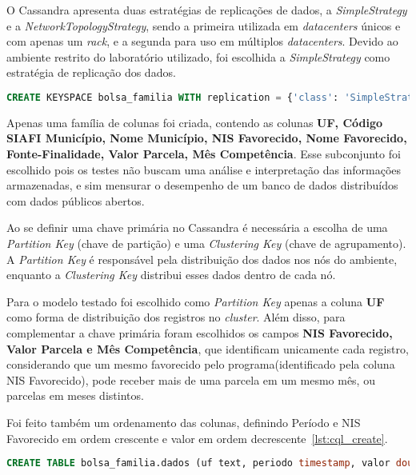 O Cassandra apresenta duas estratégias de replicações de dados, a \emph{SimpleStrategy} e a \emph{NetworkTopologyStrategy}, sendo a primeira utilizada em \emph{datacenters} únicos e com apenas um \emph{rack}, e a segunda para uso em múltiplos \emph{datacenters}. Devido ao ambiente restrito do laboratório utilizado, foi escolhida a \emph{SimpleStrategy} como estratégia de replicação dos dados.

\noindent
\begin{minipage}[c]{1\textwidth}
\begin{lstlisting}[caption={Código CQL criação do keyspace},label={lst:cql_create_keyspace},language=SQL]
CREATE KEYSPACE bolsa_familia WITH replication = {'class': 'SimpleStrategy', 'replication_factor': 1};
\end{lstlisting}
\end{minipage}

Apenas uma família de colunas foi criada, contendo as colunas \textbf{UF, Código SIAFI Município, Nome Município, NIS Favorecido, Nome Favorecido, Fonte-Finalidade, Valor Parcela, Mês Competência}. Esse subconjunto foi escolhido pois os testes não buscam uma análise e interpretação das informações armazenadas, e sim mensurar o desempenho de um banco de dados distribuídos com dados públicos abertos.

Ao se definir uma chave primária no Cassandra é necessária a escolha de uma \emph{Partition Key} (chave de partição) e uma \emph{Clustering Key} (chave de agrupamento). A \emph{Partition Key} é responsável pela distribuição dos dados nos nós do ambiente, enquanto a \emph{Clustering Key} distribui esses dados dentro de cada nó.

Para o modelo testado foi escolhido como \emph{Partition Key} apenas a coluna \textbf{UF} como forma de distribuição dos registros no \emph{cluster}. Além disso, para complementar a chave primária foram escolhidos os campos \textbf{NIS Favorecido, Valor Parcela e Mês Competência}, que identificam unicamente cada registro, considerando que um mesmo favorecido pelo programa(identificado pela coluna NIS Favorecido), pode receber mais de uma parcela em um mesmo mês, ou parcelas em meses distintos.

Foi feito também um ordenamento das colunas, definindo Período e NIS Favorecido em ordem crescente e valor em ordem decrescente~\ref{lst:cql_create}. 

\begin{lstlisting}[caption={Código CQL criação da tabela},label={lst:cql_create},language=SQL]
CREATE TABLE bolsa_familia.dados (uf text, periodo timestamp, valor double, nis_favorecido bigint, cod_municipio int, fonte text, nome_favorecido text, nome_municipio text, PRIMARY KEY(uf, periodo, valor, nis_favorecido)) WITH CLUSTERING ORDER BY(periodo ASC, valor DESC, nis_favorecido ASC);
\end{lstlisting}

